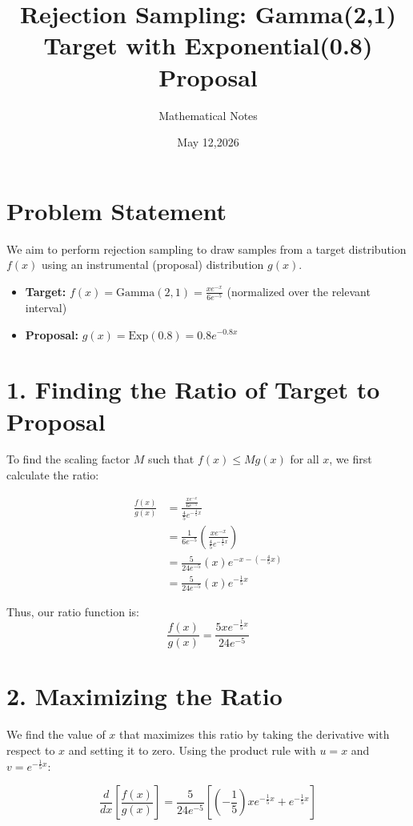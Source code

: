 \documentclass[11pt]{article}
\title{Rejection Sampling: Gamma(2,1) Target with Exponential(0.8) Proposal}
\author{Mathematical Notes}
\date{ May 12,2026}
\begin{document}
\maketitle

\section*{Problem Statement}
We aim to perform rejection sampling to draw samples from a target distribution $f(x)$ using an instrumental (proposal) distribution $g(x)$. 

\begin{itemize}
    \item \textbf{Target:} $f(x) = \text{Gamma}(2,1) = \frac{x e^{-x}}{6e^{-5}}$ (normalized over the relevant interval)
    \item \textbf{Proposal:} $g(x) = \text{Exp}(0.8) = 0.8 e^{-0.8x}$
\end{itemize}

\section*{1. Finding the Ratio of Target to Proposal}
To find the scaling factor $M$ such that $f(x) \leq M g(x)$ for all $x$, we first calculate the ratio:

\begin{align*}
\frac{f(x)}{g(x)} &= \frac{\frac{x e^{-x}}{6e^{-5}}}{\frac{4}{5} e^{-\frac{4}{5}x}} \\
&= \frac{1}{6e^{-5}} \left( \frac{x e^{-x}}{\frac{4}{5} e^{-\frac{4}{5}x}} \right) \\
&= \frac{5}{24e^{-5}} (x) e^{-x - (-\frac{4}{5}x)} \\
&= \frac{5}{24e^{-5}} (x) e^{-\frac{1}{5}x}
\end{align*}

Thus, our ratio function is:
\[ \frac{f(x)}{g(x)} = \frac{5x e^{-\frac{1}{5}x}}{24e^{-5}} \]

\section*{2. Maximizing the Ratio}
We find the value of $x$ that maximizes this ratio by taking the derivative with respect to $x$ and setting it to zero. Using the product rule with $u = x$ and $v = e^{-\frac{1}{5}x}$:

\[ \frac{d}{dx} \left[ \frac{f(x)}{g(x)} \right] = \frac{5}{24e^{-5}} \left[ \left( -\frac{1}{5} \right) x e^{-\frac{1}{5}x} + e^{-\frac{1}{5}x} \right] \]
\end{document}
